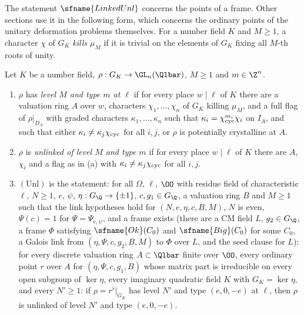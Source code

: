 The statement $\sfname{LinkedUnl}$ concerns the points of a frame. Other sections use it in the following form, which
concerns the ordinary points of the unitary deformation problems themselves. For a number field $K$ and $M\ge1$, a
character $\chi$ of $G_K$ \emph{kills $\mu_M$} if it is trivial on the elements of $G_K$ fixing all $M$-th roots of unity.

\begin{definition}\label{pf:modularity:unldef}
Let $K$ be a number field, $\rho:G_K\to\GL_n(\Qlbar)$, $M\ge1$ and $m\in\Z^n$.
\begin{enumerate}[label=(\alph*)]
\item $\rho$ has \emph{level $M$ and type $m$ at $\ell$} if for every place $w\mid\ell$ of $K$ there are a valuation ring $A$
over $w$, characters $\chi_1,\dots,\chi_n$ of $G_K$ killing $\mu_M$, and a full flag of $\rho|_{D_A}$ with graded
characters $\kappa_1,\dots,\kappa_n$ such that $\kappa_i=\chi_{\mathrm{cyc}}^{m_i}\chi_i$ on $I_A$, and such that either
$\kappa_i\ne\kappa_j\chi_{\mathrm{cyc}}$ for all $i,j$, or $\rho$ is potentially crystalline at $A$.
\item $\rho$ is \emph{unlinked of level $M$ and type $m$} if for every place $w\mid\ell$ of $K$ there are $A$, $\chi_i$
and a flag as in (a) with $\kappa_i\ne\kappa_j\chi_{\mathrm{cyc}}$ for all $i,j$.
\item $(\mathrm{Unl})$ is the statement: for all $\Omega$, $\ell$, $\OO$ with residue field of characteristic $\ell$,
$N\ge1$, $e$, $\psi$, $\eta:G_\Q\to\{\pm1\}$, $c,g_1\in G_\Q$, a valuation ring $B$ and $M\ge1$ such that the link
hypotheses hold for $(N,e,\eta,c,B,M)$, $N$ is even, $\Psi(c)=1$ for $\Psi=\Psi_{e,\psi}$, and a frame exists (there are
a CM field $L$, $g_2\in G_\Q$, a frame $\Phi$ satisfying $\sfname{Ok}(C_0)$ and $\sfname{Big}(C_0)$ for some $C_0$, a
Galois link from $(\eta,\Psi,c,g_2,B,M)$ to $\Phi$ over $L$, and the seed clause for $L$): for every discrete valuation
ring $A\subset\Qlbar$ finite over $\OO$, every ordinary point $r$ over $A$ for $(\eta,\Psi,c,g_1,B)$ whose matrix part
is irreducible on every open subgroup of $\ker\eta$, every imaginary quadratic field $K$ with $G_K=\ker\eta$, and every
$N'\ge1$: if $\rho=r^\flat|_{G_K}$ has level $N'$ and type $(e,0,-e)$ at $\ell$, then $\rho$ is unlinked of level $N'$
and type $(e,0,-e)$.
\end{enumerate}
\end{definition}

